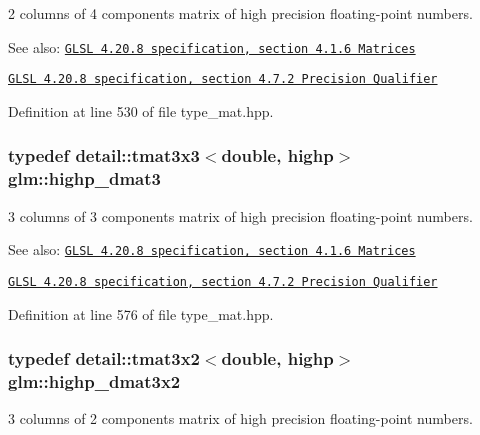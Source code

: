 2 columns of 4 components matrix of high precision floating-point numbers.

\begin{Desc}
\item[See also:]\href{http://www.opengl.org/registry/doc/GLSLangSpec.4.20.8.pdf}{\tt GLSL 4.20.8 specification, section 4.1.6 Matrices} 

\href{http://www.opengl.org/registry/doc/GLSLangSpec.4.20.8.pdf}{\tt GLSL 4.20.8 specification, section 4.7.2 Precision Qualifier} \end{Desc}


Definition at line 530 of file type\_\-mat.hpp.\hypertarget{group__core__precision_g993461e1d2caf19abd4f64d02ccdafa9}{
\subsubsection[highp\_\-dmat3]{\setlength{\rightskip}{0pt plus 5cm}typedef detail::tmat3x3$<$double, highp$>$ {\bf glm::highp\_\-dmat3}}}
\label{group__core__precision_g993461e1d2caf19abd4f64d02ccdafa9}


3 columns of 3 components matrix of high precision floating-point numbers.

\begin{Desc}
\item[See also:]\href{http://www.opengl.org/registry/doc/GLSLangSpec.4.20.8.pdf}{\tt GLSL 4.20.8 specification, section 4.1.6 Matrices} 

\href{http://www.opengl.org/registry/doc/GLSLangSpec.4.20.8.pdf}{\tt GLSL 4.20.8 specification, section 4.7.2 Precision Qualifier} \end{Desc}


Definition at line 576 of file type\_\-mat.hpp.\hypertarget{group__core__precision_gc956fe6b946f0ccee78367ccd5427351}{
\subsubsection[highp\_\-dmat3x2]{\setlength{\rightskip}{0pt plus 5cm}typedef detail::tmat3x2$<$double, highp$>$ {\bf glm::highp\_\-dmat3x2}}}
\label{group__core__precision_gc956fe6b946f0ccee78367ccd5427351}


3 columns of 2 components matrix of high precision floating-point numbers.

